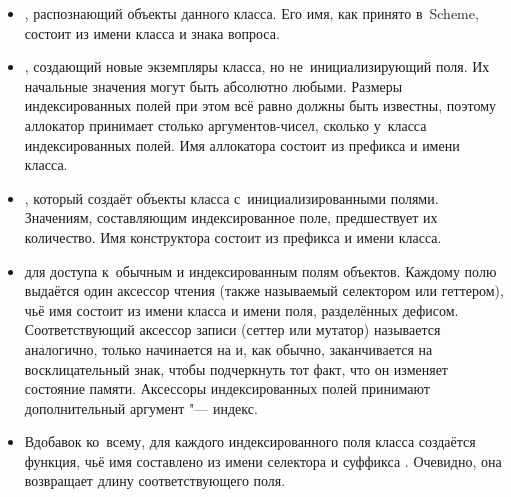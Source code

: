\begingroup
\ForLayout{display}{\expandafter\setlist[itemize]{itemsep=\smallskipamount}}
\begin{itemize}
  \item {}
        , распознающий объекты данного класса. Его имя,
        как принято в~Scheme, состоит из имени класса и знака вопроса.

  \item {}
        , создающий новые экземпляры класса, но
        не~инициализирующий поля. Их начальные значения могут быть
        абсолютно любыми. Размеры индексированных полей при этом всё
        равно должны быть известны, поэтому аллокатор принимает столько
        аргументов-чисел, сколько у~класса индексированных полей. Имя
        аллокатора состоит из префикса  и имени класса.

  \item {}
        , который создаёт объекты класса с~инициализированными
        полями. Значениям, составляющим индексированное поле, предшествует
        их количество. Имя конструктора состоит из префикса  и
        имени класса.

  \item {}
         для доступа к~обычным и индексированным полям
        объектов. Каждому полю выдаётся один аксессор чтения (также
        называемый селектором или геттером), чьё имя состоит из имени
        класса и имени поля, разделённых дефисом. Соответствующий
        аксессор записи (сеттер или мутатор) называется аналогично,
        только начинается на  и, как обычно, заканчивается на
        восклицательный знак, чтобы подчеркнуть тот факт, что он изменяет
        состояние памяти. Аксессоры индексированных полей принимают
        дополнительный аргумент "--- индекс.

  \item Вдобавок ко~всему, для каждого индексированного поля класса
        создаётся функция, чьё имя составлено из имени селектора и
        суффикса . Очевидно, она возвращает длину
        соответствующего поля.
\end{itemize}
\endgroup

